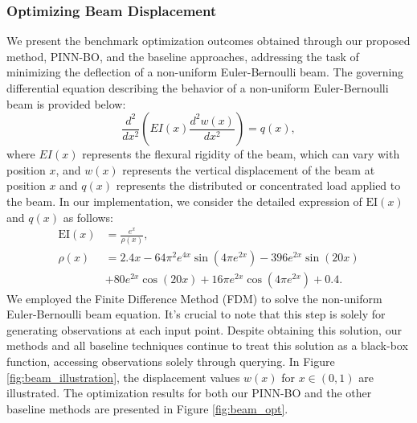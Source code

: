 \subsubsection{Optimizing Beam Displacement}
We present the benchmark optimization outcomes obtained through our proposed method, PINN-BO, and the baseline approaches, addressing the task of minimizing the deflection of a non-uniform Euler-Bernoulli beam. The governing differential equation describing the behavior of a non-uniform Euler-Bernoulli beam is provided below: 
\begin{equation*}
    \frac{d^2}{dx^2} \left( EI(x) \frac{d^2 w(x)}{dx^2} \right) = q(x),
\end{equation*}
where
$EI(x)$ represents the flexural rigidity of the beam, which can vary with position $x$, and $w(x)$ represents the vertical displacement of the beam at position $x$ and 
$q(x)$ represents the distributed or concentrated load applied to the beam. 
In our implementation, we consider the detailed expression of $\text{EI}(x)$ and $q(x)$ as follows:
\begin{align*}
    \text{EI}(x) &= \frac{e^x}{\rho(x)},\\
    \rho(x) &= 2.4 x - 64 \pi^{2} e^{4 x} \sin{\left(4 \pi e^{2 x} \right)} - 396 e^{2 x} \sin{\left(20 x \right)} \\
    &+ 80 e^{2 x} \cos{\left(20 x \right)} + 16 \pi e^{2 x} \cos{\left(4 \pi e^{2 x} \right)} + 0.4.
\end{align*}
We employed the Finite Difference Method (FDM) to solve the non-uniform Euler-Bernoulli beam equation. It's crucial to note that this step is solely for generating observations at each input point. Despite obtaining this solution, our methods and all baseline techniques continue to treat this solution as a black-box function, accessing observations solely through querying. In Figure \ref{fig:beam_illustration}, the displacement values $w(x)$ for $x \in (0,1)$ are illustrated. The optimization results for both our PINN-BO and the other baseline methods are presented in Figure \ref{fig:beam_opt}.

